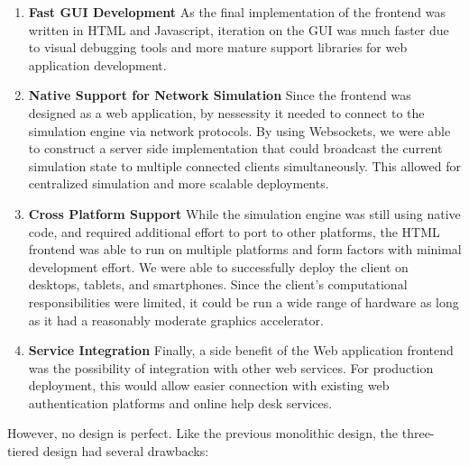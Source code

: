  \begin{enumerate}
   \item \textbf{Fast GUI Development} As the final implementation of
     the frontend was written in HTML and Javascript, iteration on the
     GUI was much faster due to visual debugging tools and more mature
     support libraries for web application development.

   \item \textbf{Native Support for Network Simulation} Since the
     frontend was designed as a web application, by nessessity it
     needed to connect to the simulation engine via network
     protocols. By using Websockets, we were able to construct a
     server side implementation that could broadcast the current
     simulation state to multiple connected clients
     simultaneously. This allowed for centralized simulation and more
     scalable deployments.

   \item \textbf{Cross Platform Support} While the simulation engine
     was still using native code, and required additional effort to
     port to other platforms, the HTML frontend was able to run on
     multiple platforms and form factors with minimal development
     effort. We were able to successfully deploy the client on
     desktops, tablets, and smartphones. Since the client's
     computational responsibilities were limited, it could be run a
     wide range of hardware as long as it had a reasonably moderate
     graphics accelerator.

   \item \textbf{Service Integration} Finally, a side benefit of the
     Web application frontend was the possibility of integration with
     other web services. For production deployment, this would allow
     easier connection with existing web authentication platforms and
     online help desk services. 
     
 \end{enumerate}


 However, no design is perfect. Like the previous monolithic design,
 the three-tiered design had several drawbacks:


